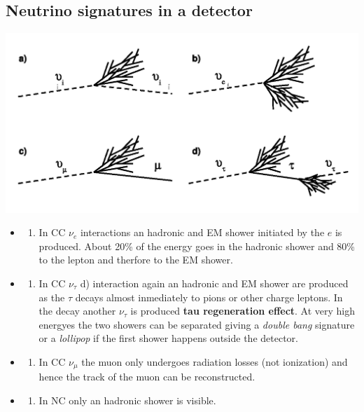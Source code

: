 \documentclass[
  letterpaper,
  DIV=11,
  numbers=noendperiod]{scrreprt}
\providecommand{\tightlist}{%
  \setlength{\itemsep}{0pt}\setlength{\parskip}{0pt}}\usepackage{longtable,booktabs,array}
\begin{document}
\subsection*{Neutrino signatures in a
detector}\label{neutrino-signatures-in-a-detector}

\includegraphics{images/nu_signatures.png}

\begin{itemize}
\tightlist
\item
  \begin{enumerate}
  \def\labelenumi{\alph{enumi})}
  \setcounter{enumi}{1}
  \tightlist
  \item
    In CC \(\nu_e\) interactions an hadronic and EM shower initiated by
    the \(e\) is produced. About 20\% of the energy goes in the hadronic
    shower and 80\% to the lepton and therfore to the EM shower.
  \end{enumerate}
\item
  \begin{enumerate}
  \def\labelenumi{\alph{enumi})}
  \setcounter{enumi}{3}
  \tightlist
  \item
    In CC \(\nu_\tau\) d) interaction again an hadronic and EM shower
    are produced as the \(\tau\) decays almost inmediately to pions or
    other charge leptons. In the decay another \(\nu_\tau\) is produced
    \textbf{tau regeneration effect}. At very high energyes the two
    showers can be separated giving a \emph{double bang} signature or a
    \emph{lollipop} if the first shower happens outside the detector.
  \end{enumerate}
\item
  \begin{enumerate}
  \def\labelenumi{\alph{enumi})}
  \setcounter{enumi}{2}
  \tightlist
  \item
    In CC \(\nu_\mu\) the muon only undergoes radiation losses (not
    ionization) and hence the track of the muon can be reconstructed.
  \end{enumerate}
\item
  \begin{enumerate}
  \def\labelenumi{\alph{enumi})}
  \tightlist
  \item
    In NC only an hadronic shower is visible.
  \end{enumerate}
\end{itemize}
\end{document}
